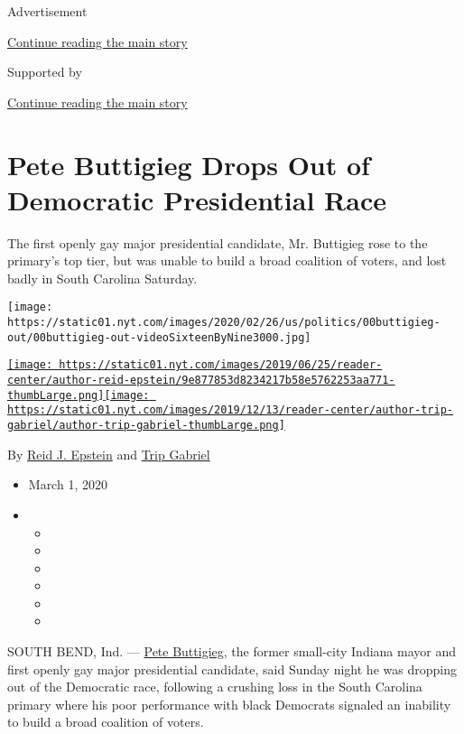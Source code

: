 Advertisement

\protect\hyperlink{after-top}{Continue reading the main story}

Supported by

\protect\hyperlink{after-sponsor}{Continue reading the main story}

\hypertarget{pete-buttigieg-drops-out-of-democratic-presidential-race}{%
\section{Pete Buttigieg Drops Out of Democratic Presidential
Race}\label{pete-buttigieg-drops-out-of-democratic-presidential-race}}

The first openly gay major presidential candidate, Mr. Buttigieg rose to
the primary's top tier, but was unable to build a broad coalition of
voters, and lost badly in South Carolina Saturday.

\texttt{[image: https://static01.nyt.com/images/2020/02/26/us/politics/00buttigieg-out/00buttigieg-out-videoSixteenByNine3000.jpg]}

\href{https://www.nytimes.com/by/reid-j-epstein}{\texttt{[image: https://static01.nyt.com/images/2019/06/25/reader-center/author-reid-epstein/9e877853d8234217b58e5762253aa771-thumbLarge.png]}}\href{https://www.nytimes.com/by/trip-gabriel}{\texttt{[image: https://static01.nyt.com/images/2019/12/13/reader-center/author-trip-gabriel/author-trip-gabriel-thumbLarge.png]}}

By \href{https://www.nytimes.com/by/reid-j-epstein}{Reid J. Epstein} and
\href{https://www.nytimes.com/by/trip-gabriel}{Trip Gabriel}

\begin{itemize}
\item
  March 1, 2020
\item
  \begin{itemize}
  \item
  \item
  \item
  \item
  \item
  \item
  \end{itemize}
\end{itemize}

SOUTH BEND, Ind. ---
\href{https://www.nytimes.com/interactive/2020/us/elections/pete-buttigieg.html}{Pete
Buttigieg}, the former small-city Indiana mayor and first openly gay
major presidential candidate, said Sunday night he was dropping out of
the Democratic race, following a crushing loss in the South Carolina
primary where his poor performance with black Democrats signaled an
inability to build a broad coalition of voters.

